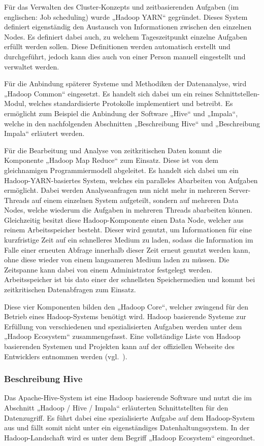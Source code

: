 Für das Verwalten des Cluster\hyp{}Konzepts und zeitbasierenden Aufgaben (im
englischen: Job scheduling) wurde „Hadoop YARN“ gegründet. Dieses System
definiert eigenständig den Austausch von Informationen zwischen den einzelnen
Nodes. Es definiert dabei auch, zu welchem Tageszeitpunkt einzelne Aufgaben
erfüllt werden sollen. Diese Definitionen werden automatisch erstellt und
durchgeführt, jedoch kann dies auch von einer Person manuell eingestellt und
verwaltet werden.

Für die Anbindung späterer Systeme und Methodiken der Datenanalyse, wird
„Hadoop Common“ eingesetzt. Es handelt sich dabei um ein reines
Schnittstellen\hyp{}Modul, welches standardisierte Protokolle implementiert und
betreibt. Es ermöglicht zum Beispiel die Anbindung der Software „Hive“ und
„Impala“, welche in den nachfolgenden Abschnitten „Beschreibung Hive“
und „Beschreibung Impala“ erläutert werden.

Für die Bearbeitung und Analyse von zeitkritischen Daten kommt die Komponente
„Hadoop Map Reduce“ zum Einsatz. Diese ist von dem gleichnamigen
Programmiermodell abgeleitet. Es handelt sich dabei um ein
Hadoop\hyp{}YARN\hyp{}basiertes System, welches ein paralleles Abarbeiten von
Aufgaben ermöglicht. Dabei werden Analyseanfragen nun nicht mehr in mehreren
Server\hyp{}Threads auf einem einzelnen System aufgeteilt, sondern auf mehreren
Data Nodes, welche wiederum die Aufgaben in mehreren Threads abarbeiten können.
Gleichzeitig besitzt diese Hadoop\hyp{}Komponente einen Data Node, welcher aus
reinem Arbeitsspeicher besteht. Dieser wird genutzt, um Informationen für eine
kurzfristige Zeit auf ein schnelleres Medium zu laden, sodass die Information
im Falle einer erneuten Abfrage innerhalb dieser Zeit erneut genutzt werden
kann, ohne diese wieder von einem langsameren Medium laden zu müssen. Die
Zeitspanne kann dabei von einem Administrator festgelegt werden.
Arbeitsspeicher ist bis dato einer der schnellsten Speichermedien und kommt bei
zeitkritischen Datenabfragen zum Einsatz.

Diese vier Komponenten bilden den „Hadoop Core“, welcher zwingend für den
Betrieb eines Hadoop\hyp{}Systems benötigt wird. Hadoop basierende Systeme zur
Erfüllung von verschiedenen und spezialisierten Aufgaben werden unter dem
„Hadoop Ecosystem“ zusammengefasst. Eine vollständige Liste von Hadoop
basierenden Systemen und Projekten kann auf der offiziellen Webseite des
Entwicklers entnommen werden (vgl.~\cite{Hadoop_related_projects}).
\nl%

\subsubsection{Beschreibung Hive}
\label{subsubsec:hive_beschreibung}
Das Apache\hyp{}Hive\hyp{}System ist eine Hadoop basierende Software und nutzt
die im Abschnitt „Hadoop / Hive / Impala“ erläuterten Schnittstellten
für den Datenzugriff. Es führt dabei eine spezialisierte Aufgabe auf dem
Hadoop\hyp{}System aus und fällt somit nicht unter ein eigenständiges
Datenhaltungssystem. In der Hadoop\hyp{}Landschaft wird es unter dem Begriff
„Hadoop Ecosystem“ eingeordnet.

